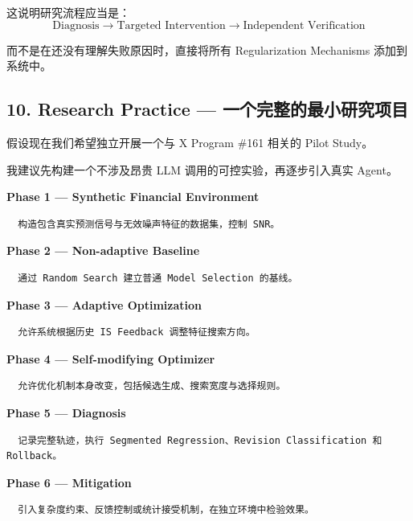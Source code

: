 这说明研究流程应当是：
\[\boxed{
\text{Diagnosis}
\longrightarrow
\text{Targeted Intervention}
\longrightarrow
\text{Independent Verification}
}\]

而不是在还没有理解失败原因时，直接将所有 Regularization Mechanisms 添加到系统中。

\hypertarget{part-3-48-0001-research-practice-ux4e00ux4e2aux5b8cux6574ux7684ux6700ux5c0fux7814ux7a76ux9879ux76ee}{%
\subsection{10. Research Practice --- 一个完整的最小研究项目}\label{part-3-48-0001-research-practice-ux4e00ux4e2aux5b8cux6574ux7684ux6700ux5c0fux7814ux7a76ux9879ux76ee}}

假设现在我们希望独立开展一个与 X Program \#161 相关的 Pilot Study。

我建议先构建一个不涉及昂贵 LLM 调用的可控实验，再逐步引入真实 Agent。

\textbf{Phase 1 --- Synthetic Financial Environment}

\begin{verbatim}
  构造包含真实预测信号与无效噪声特征的数据集，控制 SNR。
\end{verbatim}

\textbf{Phase 2 --- Non-adaptive Baseline}

\begin{verbatim}
  通过 Random Search 建立普通 Model Selection 的基线。
\end{verbatim}

\textbf{Phase 3 --- Adaptive Optimization}

\begin{verbatim}
  允许系统根据历史 IS Feedback 调整特征搜索方向。
\end{verbatim}

\textbf{Phase 4 --- Self-modifying Optimizer}

\begin{verbatim}
  允许优化机制本身改变，包括候选生成、搜索宽度与选择规则。
\end{verbatim}

\textbf{Phase 5 --- Diagnosis}

\begin{verbatim}
  记录完整轨迹，执行 Segmented Regression、Revision Classification 和 Rollback。
\end{verbatim}

\textbf{Phase 6 --- Mitigation}

\begin{verbatim}
  引入复杂度约束、反馈控制或统计接受机制，在独立环境中检验效果。
\end{verbatim}

